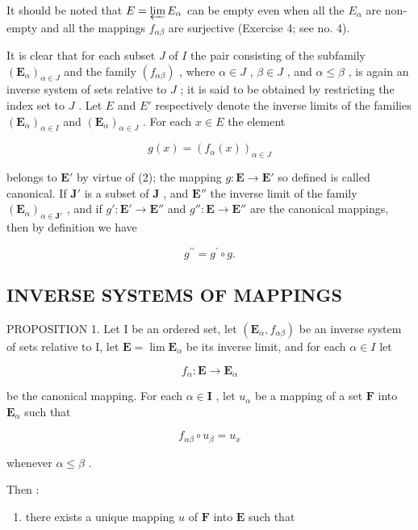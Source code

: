 It should be noted that \(E = \varprojlim E_{\alpha}\) can be empty even when all the \(E_{\alpha}\) are non-empty and all the mappings \(f_{\alpha\beta}\) are surjective (Exercise 4; see no. 4).

It is clear that for each subset \(J\) of \(I\) the pair consisting of the subfamily \((\mathbf{E}_{\alpha})_{\alpha \in J}\) and the family \((f_{\alpha \beta})\) , where \(\alpha \in J\) , \(\beta \in J\) , and \(\alpha \leqslant \beta\) , is again an inverse system of sets relative to \(J\) ; it is said to be obtained by restricting the index set to \(J\) . Let \(E\) and \(E'\) respectively denote the inverse limits of the families \((\mathbf{E}_{\alpha})_{\alpha \in I}\) and \((\mathbf{E}_{\alpha})_{\alpha \in J}\) . For each \(x \in E\) the element

\[
g (x) = \left(f _ {\alpha} (x)\right) _ {\alpha \in J}\tag{3}
\]

belongs to \(\mathbf{E}'\) by virtue of (2); the mapping \(g: \mathbf{E} \to \mathbf{E}'\) so defined is called canonical. If \(\mathbf{J}'\) is a subset of \(\mathbf{J}\) , and \(\mathbf{E}''\) the inverse limit of the family \((\mathbf{E}_{\alpha})_{\alpha \in \mathbf{J}'}\) , and if \(g': \mathbf{E}' \to \mathbf{E}''\) and \(g'': \mathbf{E} \to \mathbf{E}''\) are the canonical mappings, then by definition we have

\[
g ^ {\prime \prime} = g ^ {\prime} \circ g.\tag{4}
\]

\subsection{INVERSE SYSTEMS OF MAPPINGS}

PROPOSITION 1. Let I be an ordered set, let \((\mathbf{E}_{\alpha}, f_{\alpha \beta})\) be an inverse system of sets relative to I, let \(\mathbf{E} = \lim \mathbf{E}_{\alpha}\) be its inverse limit, and for each \(\alpha \in I\) let

\[
f _ {\alpha}: \mathbf {E} \rightarrow \mathbf {E} _ {\alpha}
\]

be the canonical mapping. For each \(\alpha \in \mathbf{I}\) , let \(u_{\alpha}\) be a mapping of a set \(\mathbf{F}\) into \(\mathbf{E}_{\alpha}\) such that

\[
f _ {\alpha \beta} \circ u _ {\beta} = u _ {x}\tag{5}
\]

whenever \(\alpha \leqslant \beta\) .

Then :

\begin{enumerate}
\def\labelenumi{(\alph{enumi})}
\tightlist
\item
  there exists a unique mapping \(u\) of \(\mathbf{F}\) into \(\mathbf{E}\) such that
\end{enumerate}

